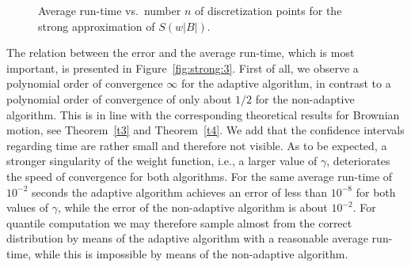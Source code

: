 \documentclass[a4paper]{amsart}
\theoremstyle{definition}
\theoremstyle{plain}
\begin{document}
\begin{figure}
	\caption{Average run-time vs.\ number $n$ of discretization points
		for the strong approximation of $S(w|B|)$.}
	\label{fig:strong:2}
\end{figure}

The relation between the error and the average run-time, which is
most important, is presented in Figure~\ref{fig:strong:3}.
First of all, we observe a polynomial order of convergence $\infty$
for the adaptive algorithm, in contrast to a polynomial
order of convergence of only about $1/2$ for the non-adaptive
algorithm. This is in line with the corresponding theoretical results
for Brownian motion, see Theorem~\ref{t3} and Theorem~\ref{t4}.
We add that the confidence intervals
regarding time are rather small and therefore
not visible.
As to be expected, a stronger singularity of the weight function, i.e.,
a larger value of $\gamma$, deteriorates the speed of convergence
for both algorithms.
For the same average run-time of $10^{-2}$ seconds the adaptive algorithm
achieves an error of less than $10^{-8}$ for both values of $\gamma$,
while the error of the non-adaptive algorithm is about $10^{-2}$.
For quantile computation we may therefore sample almost from the correct
distribution by means of the adaptive algorithm with a reasonable average
run-time, while this is impossible by means of the non-adaptive
algorithm.
\end{document}
